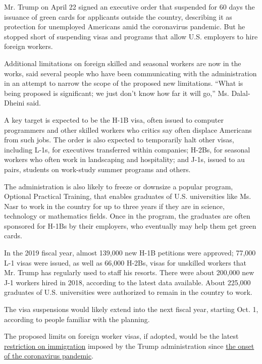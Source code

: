 Mr. Trump on April 22 signed an executive order that suspended for 60
days the issuance of green cards for applicants outside the country,
describing it as protection for unemployed Americans amid the
coronavirus pandemic. But he stopped short of suspending visas and
programs that allow U.S. employers to hire foreign workers.

Additional limitations on foreign skilled and seasonal workers are now
in the works, said several people who have been communicating with the
administration in an attempt to narrow the scope of the proposed new
limitations. ``What is being proposed is significant; we just don't know
how far it will go,'' Ms. Dalal-Dheini said.

A key target is expected to be the H-1B visa, often issued to computer
programmers and other skilled workers who critics say often displace
Americans from such jobs. The order is also expected to temporarily halt
other visas, including L-1s, for executives transferred within
companies; H-2Bs, for seasonal workers who often work in landscaping and
hospitality; and J-1s, issued to au pairs, students on work-study summer
programs and others.

The administration is also likely to freeze or downsize a popular
program, Optional Practical Training, that enables graduates of U.S.
universities like Ms. Nasr to work in the country for up to three years
if they are in science, technology or mathematics fields. Once in the
program, the graduates are often sponsored for H-1Bs by their employers,
who eventually may help them get green cards.

In the 2019 fiscal year, almost 139,000 new H-1B petitions were
approved; 77,000 L-1 visas were issued, as well as 66,000 H-2Bs, visas
for unskilled workers that Mr. Trump has regularly used to staff his
resorts. There were about 200,000 new J-1 workers hired in 2018,
according to the latest data available. About 225,000 graduates of U.S.
universities were authorized to remain in the country to work.

The visa suspensions would likely extend into the next fiscal year,
starting Oct. 1, according to people familiar with the planning.

The proposed limits on foreign worker visas, if adopted, would be the
latest
\href{https://www.nytimes3xbfgragh.onion/2020/06/12/us/politics/coronavirus-trump-immigration-policies.html?searchResultPosition=2}{restriction
on immigration} imposed by the Trump administration since
\href{https://www.nytimes3xbfgragh.onion/2020/05/03/us/coronavirus-immigration-stephen-miller-public-health.html}{the
onset of the coronavirus pandemic}.

